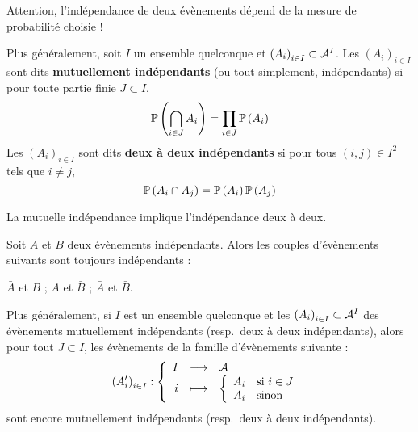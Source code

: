 \documentclass[../integ-proba.tex]{subfiles}
\begin{document}
    \begin{rem}
        Attention, l'indépendance de deux évènements dépend de la mesure de probabilité choisie !
    \end{rem}

    \begin{defi}
        Plus généralement, soit $I$ un ensemble quelconque et $\left( A_i \right)_{i \in I} \subset \mathcal{A}^I$.
        Les $\left( A_i \right)_{i \in I}$ sont dits \textbf{mutuellement indépendants} (ou tout simplement, indépendants) si pour toute partie finie $J \subset I$,
        \begin{displaymath}
            \mathbb{P}\left( \bigcap_{i \in J} A_i\right) = \prod_{i \in J} \mathbb{P}\left( A_i \right)
        \end{displaymath}
        Les $\left( A_i \right)_{i \in I}$ sont dits \textbf{deux à deux indépendants} si pour tous $\left( i,j \right) \in I^2$ tels que $i \neq j$,
        \begin{displaymath}
            \mathbb{P}\left( A_i \cap A_j \right) = \mathbb{P}\left( A_i \right) \mathbb{P} \left( A_j \right)
        \end{displaymath}
    \end{defi}

    \begin{prop}
        La mutuelle indépendance implique l'indépendance deux à deux.
    \end{prop}

    \begin{prop}
        Soit $A$ et $B$ deux évènements indépendants.
        Alors les couples d'évènements suivants sont toujours indépendants :
        \begin{itemize}
            \itemb $\bar{A}$ et $B$ ;
            \itemb $A$ et $\bar{B}$ ;
            \itemb $\bar{A}$ et $\bar{B}$.
        \end{itemize}
        Plus généralement, si $I$ est un ensemble quelconque et les $\left( A_i \right)_{i \in I} \subset \mathcal{A}^I$ des évènements mutuellement indépendants (resp.\ deux à deux indépendants), alors pour tout $J \subset I$, les évènements de la famille d'évènements suivante :
        \begin{displaymath}
            \left( A'_i \right)_{i \in I} :
            \left\{
            \begin{array}{rcl}
                I & \longrightarrow & \mathcal{A} \\
                i & \longmapsto     & \left\{ \begin{array}{rl}
                                                  \bar{A_i} & \textnormal{si } i \in J \\
                                                  A_i       & \textnormal{sinon}
                                                \end{array} \right.
            \end{array}
            \right.
        \end{displaymath}
        sont encore mutuellement indépendants (resp.\ deux à deux indépendants).
    \end{prop}
\end{document}
